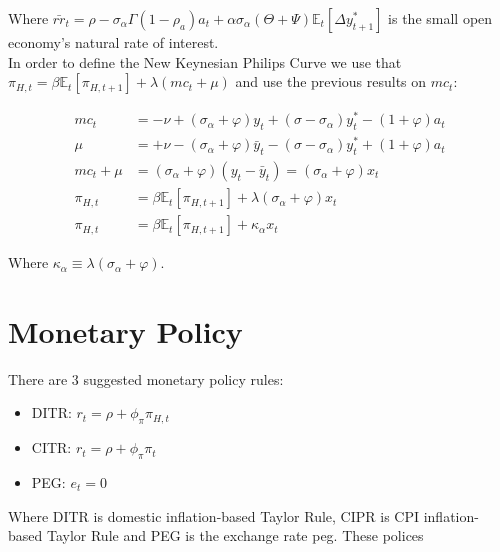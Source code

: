 \documentclass{article}
\newcommand{\Et}{\mathbb{E}_t}
\begin{document}
Where $\bar{rr}_t = \rho - \sigma_\alpha \Gamma (1-\rho_a)a_t + \alpha \sigma_\alpha (\Theta + \Psi) \Et[\Delta y_{t+1}^*]$ is the small open economy's natural rate of interest.\\

In order to define the New Keynesian Philips Curve we use that $\pi_{H, t} = \beta \Et[\pi_{H, t+1}] + \lambda (mc_t + \mu)$ and use the previous results on $mc_t$:

\begin{equation*}
    \begin{split}
        mc_t & = -\nu + (\sigma_\alpha + \varphi) y_t + (\sigma - \sigma_\alpha) y_t^* - (1+ \varphi) a_t \\
        \mu & = + \nu -(\sigma_\alpha + \varphi) \bar y_t - (\sigma - \sigma_\alpha) y_t^* + (1+ \varphi) a_t\\
        mc_t + \mu &= (\sigma_\alpha + \varphi)(y_t - \bar y_t) = (\sigma_\alpha + \varphi)x_t\\
        \pi_{H, t} &= \beta \Et[\pi_{H, t+1}] + \lambda (\sigma_\alpha + \varphi)x_t\\
        \pi_{H, t} &= \beta \Et[\pi_{H, t+1}] + \kappa_\alpha x_t
    \end{split}
\end{equation*}

Where $\kappa_\alpha \equiv \lambda (\sigma_\alpha + \varphi)$.

\section{Monetary Policy}

There are 3 suggested monetary policy rules:
\begin{itemize}
    \item DITR: $r_t = \rho + \phi_\pi \pi_{H,t}$
    \item CITR: $r_t = \rho + \phi_\pi \pi_{t}$
    \item PEG: $e_t = 0$
\end{itemize}

Where DITR is domestic inflation-based Taylor Rule, CIPR is CPI inflation-based Taylor Rule and PEG is the exchange rate peg. These polices
\end{document}
